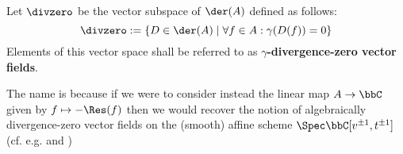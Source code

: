         \begin{definition} \label{def: yangian_div_zero_vector_fields}
            Let $\divzero$ be the vector subspace of $\der(A)$ defined as follows:
                $$\divzero := \{ D \in \der(A) \mid \forall f \in A: \gamma(D(f)) = 0 \}$$
            Elements of this vector space shall be referred to as \textbf{$\gamma$-divergence-zero vector fields}.
        \end{definition}
        \begin{remark}
            The name is because if we were to consider instead the linear map $A \to \bbC$ given by $f \mapsto -\Res(f)$ then we would recover the notion of algebraically divergence-zero vector fields on the (smooth) affine scheme $\Spec \bbC[v^{\pm 1}, t^{\pm 1}]$ (cf. e.g. \cite[Exercise 1.7c]{neher_lectures_on_EALAs} and \cite{billig_talboom_category_J_for_div_zero_vector_fields_on_tori})
        \end{remark}

